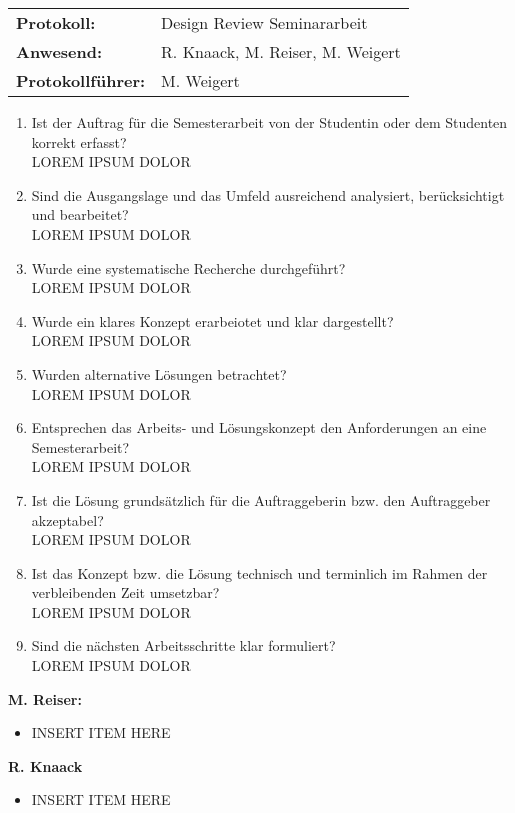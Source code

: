 \begin{tabular}{ll}
	\textbf{Protokoll:} & Design Review Seminararbeit \\
	\textbf{Anwesend:} & R. Knaack, M. Reiser, M. Weigert \\
	\textbf{Protokollführer:} & M. Weigert \\
\end{tabular}

\begin{enumerate}
	\item Ist der Auftrag für die Semesterarbeit von der Studentin oder dem Studenten korrekt erfasst? \\
	{\color{DarkSlateBlue}LOREM IPSUM DOLOR}
	\item Sind die Ausgangslage und das Umfeld ausreichend analysiert, berücksichtigt und bearbeitet? \\
	{\color{DarkSlateBlue}LOREM IPSUM DOLOR}
	\item Wurde eine systematische Recherche durchgeführt?\\
	{\color{DarkSlateBlue}LOREM IPSUM DOLOR}
	\item Wurde ein klares Konzept erarbeiotet und klar dargestellt?\\
	{\color{DarkSlateBlue}LOREM IPSUM DOLOR}
	\item Wurden alternative Lösungen betrachtet? \\
	{\color{DarkSlateBlue}LOREM IPSUM DOLOR}
	\item Entsprechen das Arbeits- und Lösungskonzept den Anforderungen an eine Semesterarbeit? \\
	{\color{DarkSlateBlue}LOREM IPSUM DOLOR}
	\item Ist die Lösung grundsätzlich für die Auftraggeberin bzw. den Auftraggeber akzeptabel? \\
	{\color{DarkSlateBlue}LOREM IPSUM DOLOR}
	\item Ist das Konzept bzw. die Lösung technisch und terminlich im Rahmen der verbleibenden Zeit umsetzbar? \\
	{\color{DarkSlateBlue}LOREM IPSUM DOLOR}
	\item Sind die nächsten Arbeitsschritte klar formuliert?\\
	{\color{DarkSlateBlue}LOREM IPSUM DOLOR}
\end{enumerate}

\textbf{M. Reiser:}
\begin{itemize}
	\item INSERT ITEM HERE
\end{itemize}

\textbf{R. Knaack}
\begin{itemize}
	\item INSERT ITEM HERE
\end{itemize}